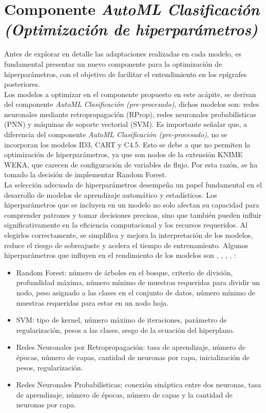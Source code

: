 \section{Componente \textit{AutoML Clasificación (Optimización de hiperparámetros)}}
Antes de explorar en detalle las adaptaciones realizadas en cada modelo, es fundamental presentar un nuevo componente para la optimización de hiperparámetros, con el objetivo de facilitar el entendimiento en los epígrafes posteriores. \\
Los modelos a optimizar en el componente propuesto en este acápite, se derivan del componente \textit{AutoML Clasificación (pre-procesado)}, dichos modelos son: redes neuronales mediante retropropagación (RProp), redes neuronales probabilísticas (PNN) y máquinas de soporte vectorial (SVM). Es importante señalar que, a diferencia del componente \textit{AutoML Clasificación (pre-procesado)}, no se incorporan los modelos ID3, CART y C4.5. Esto se debe a que no permiten la optimización de hiperparámetros, ya que son nodos de la extensión KNIME WEKA, que carecen de configuración de variables de flujo. Por esta razón, se ha tomado la decisión de implementar Random Forest. \\
La selección adecuada de hiperparámetros desempeña un papel fundamental en el desarrollo de modelos de aprendizaje automático y estadísticos. Los hiperparámetros que se incluyen en un modelo no solo afectan su capacidad para comprender patrones y tomar decisiones precisas, sino que también pueden influir significativamente en la eficiencia computacional y los recursos requeridos. Al elegirlos correctamente, se simplifica y mejora la interpretación de los modelos, reduce el riesgo de sobreajuste y acelera el tiempo de entrenamiento. Algunos hiperparámetros que influyen en el rendimiento de los modelos son \citep{montavon2012neural}, \citep{scholkopf2018learning}, \citep{lakshmanan2021practical}, \citep{hastie2009elements}, \citep{gupta2017analysis}: 
\begin{itemize}
	\item Random Forest: número de árboles en el bosque, criterio de división, profundidad máxima, número mínimo de muestras requeridas para dividir un nodo, peso asignado a las clases en el conjunto de datos, número mínimo de muestras requeridas para estar en un nodo hoja.
	
	\item SVM: tipo de kernel, número máximo de iteraciones, parámetro de regularización, pesos a las clases, sesgo de la ecuación del hiperplano.
	
	\item Redes Neuronales por Retropropagación: tasa de aprendizaje, número de épocas, número de capas, cantidad de neuronas por capa, inicialización de pesos, regularización.
	
	\item Redes Neuronales Probabilísticas: conexión sináptica entre dos neuronas, tasa de aprendizaje, número de épocas, número de capas y la cantidad de neuronas por capa.
\end{itemize}

